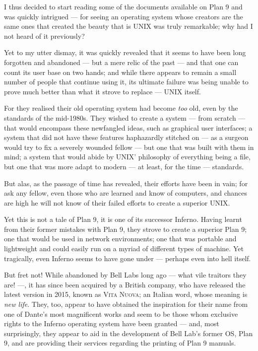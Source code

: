 \documentclass[a5paper,twoside,12pt]{report}
\begin{document}
I thus decided to start reading some of the documents available on Plan 9 and was quickly intrigued — for seeing an operating system whose creators are the same ones that created the beauty that is UNIX was truly remarkable; why had I not heard of it previously?

Yet to my utter dismay, it was quickly revealed that it seems to have been long forgotten and abandoned — but a mere relic of the past — and that one can count its user base on two hands; and while there appears to remain a small number of people that continue using it, its ultimate failure was being unable to prove much better than what it strove to replace — UNIX itself.

For they realised their old operating system had become \textit{too} old, even by the standards of the mid-1980s. They wished to create a system — from scratch — that would encompass these newfangled ideas, such as graphical user interfaces; a system that did not have these features haphazardly stitched on — as a surgeon would try to fix a severely wounded fellow — but one that was built with them in mind; a system that would abide by UNIX' philosophy of everything being a file, but one that was more adapt to modern — at least, for the time — standards.

But alas, as the passage of time has revealed, their efforts have been in vain; for ask any fellow, even those who are learned and know of computers, and chances are high he will not know of their failed efforts to create a superior UNIX.

Yet this is not a tale of Plan 9, it is one of its successor Inferno. Having learnt from their former mistakes with Plan 9, they strove to create a superior Plan 9; one that would be used in network environments; one that was portable and lightweight and could easily run on a myriad of different types of machine.
Yet tragically, even Inferno seems to have gone under — perhaps even into hell itself.

But fret not! While abandoned by Bell Labs long ago — what vile traitors they are! —, it has since been acquired by a British company, who have released the latest version in 2015, known as \textsc{Vita Nuova}; an Italian word, whose meaning is \textit{new life}. They, too, appear to have obtained the inspiration for their name from one of Dante's most magnificent works and seem to be those whom exclusive rights to the Inferno operating system have been granted — and, most surprisingly, they appear to aid in the development of Bell Lab's former OS, Plan 9, and are providing their services regarding the printing of Plan 9 manuals.
\end{document}
